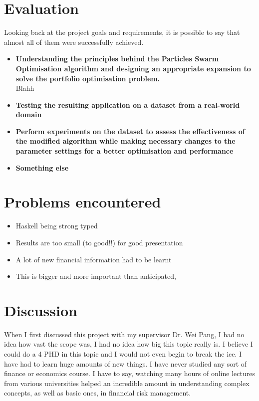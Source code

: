 \documentclass{pdfmx4020}
\begin{document}
  \section{Evaluation} %
  \label{sec:evaluation}
  Looking back at the project goals and requirements, it is possible to say that almost all of them were successfully achieved. 
  \begin{itemize}
    \item \textbf{Understanding the principles behind the Particles Swarm Optimisation algorithm and designing an appropriate expansion to solve the portfolio optimisation problem.} \\
    Blahh
    \item \textbf{Testing the resulting application on a dataset from a real-world domain} \\
    \item \textbf{Perform experiments on the dataset to assess the effectiveness of the modified algorithm while making necessary changes to the parameter settings for a better optimisation and performance} \\
    \item \textbf{Something else} \\
  \end{itemize}

  \section{Problems encountered} %
  \label{sec:problems_encountered}
    \begin{itemize}
      \item Haskell being strong typed
      \item Results are too small (to good!!) for good presentation
      \item A lot of new financial information had to be learnt
      \item This is bigger and more important than anticipated, 
    \end{itemize}

  \section{Discussion} %
  \label{sec:discussion}
  When I first discussed this project with my supervisor Dr. Wei Pang, I had no idea how vast the scope was, I had no idea how big this topic really is. I believe I could do a 4 PHD in this topic and I would not even begin to break the ice. I have had to learn huge amounts of new things. I have never studied any sort of finance or economics course. I have to say, watching many hours of online lectures from various universities helped an incredible amount in understanding complex concepts, as well as basic ones, in financial risk management.
\end{document}
